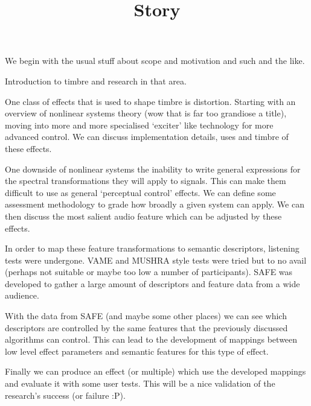 \documentclass[a4paper]{article}
\title{Story}
\author{}
\date{}
\begin{document}
\maketitle

	We begin with the usual stuff about scope and motivation and such and the like.

	Introduction to timbre and research in that area.

	One class of effects that is used to shape timbre is distortion. Starting with an overview of nonlinear systems theory (wow that is far too grandiose a title), moving into more and more specialised `exciter' like technology for more advanced control. We can discuss implementation details, uses and timbre of these effects.

	One downside of nonlinear systems the inability to write general expressions for the spectral transformations they will apply to signals. This can make them difficult to use as general `perceptual control' effects. We can define some assessment methodology to grade how broadly a given system can apply. We can then discuss the most salient audio feature which can be adjusted by these effects.

	In order to map these feature transformations to semantic descriptors, listening tests were undergone. VAME and MUSHRA style tests were tried but to no avail (perhaps not suitable or maybe too low a number of participants). SAFE was developed to gather a large amount of descriptors and feature data from a wide audience.

	With the data from SAFE (and maybe some other places) we can see which descriptors are controlled by the same features that the previously discussed algorithms can control. This can lead to the development of mappings between low level effect parameters and semantic features for this type of effect.

	Finally we can produce an effect (or multiple) which use the developed mappings and evaluate it with some user tests. This will be a nice validation of the research's success (or failure :P).
\end{document}
